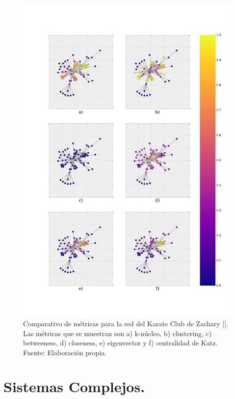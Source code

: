 \documentclass[../main.tex]{subfiles}
\begin{document}
\begin{figure}[h!]
    \centering
    \includegraphics[scale = 0.40]{images/marcoteorico_barabasi (1).pdf}
    \caption{Comparativo de métricas para la red del Karate Club  de Zachary [\cite{Zachary_1977}]. Las métricas que se muestran son a) k-núcleo, b) clustering, c) betweeness, d) closeness, e) eigenvector y  f) centralidad de Katz.   Fuente: Elaboración propia.}
    \label{fig:marcoteorico_scale_free}
\end{figure}


\newpage
\section{Sistemas Complejos.}
\end{document}
